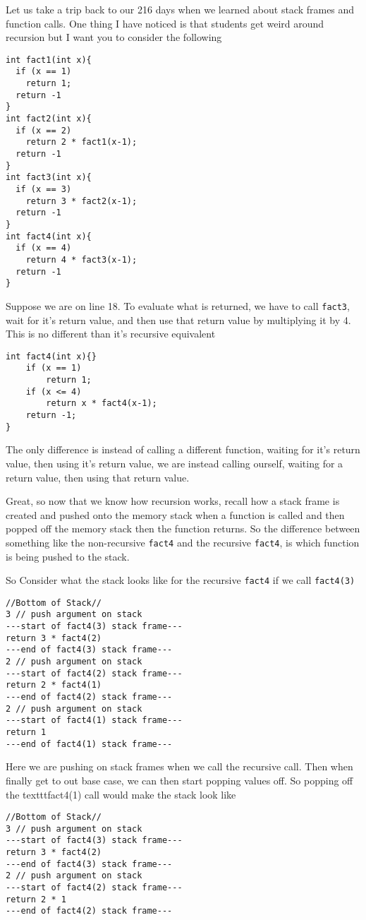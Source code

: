 \documentclass[main.tex]{subfiles}
\begin{document}
Let us take a trip back to our 216 days when we learned about stack frames and function calls. 
One thing I have noticed is that students get weird around recursion but I want you to consider the following 
\begin{lstlisting}[style=Mycstyle]
int fact1(int x){
  if (x == 1)
    return 1;
  return -1
}
int fact2(int x){
  if (x == 2)
    return 2 * fact1(x-1);
  return -1
}
int fact3(int x){
  if (x == 3)
    return 3 * fact2(x-1);
  return -1
}
int fact4(int x){
  if (x == 4)
    return 4 * fact3(x-1);
  return -1
}
\end{lstlisting}
Suppose we are on line 18. To evaluate what is returned, we have to call \texttt{fact3}, wait for it's return value, and then use that return value by multiplying it by 4. This is no different than it's recursive equivalent
\begin{lstlisting}[style=Mycstyle]
int fact4(int x){}
    if (x == 1)
        return 1;
    if (x <= 4)
        return x * fact4(x-1);
    return -1;
}
\end{lstlisting}
The only difference is instead of calling a different function, waiting for it's return value, then using it's return value, we are instead calling ourself, waiting for a return value, then using that return value. 

Great, so now that we know how recursion works, recall how a stack frame is created and pushed onto the memory stack when a function is called and then popped off the memory stack then the function returns. So the difference between something like the non-recursive \texttt{fact4} and the recursive \texttt{fact4}, is which function is being pushed to the stack. 

So Consider what the stack looks like for the recursive \texttt{fact4} if we call \texttt{fact4(3)}
\begin{lstlisting}[style=Mycstyle]
//Bottom of Stack//
3 // push argument on stack
---start of fact4(3) stack frame---
return 3 * fact4(2)
---end of fact4(3) stack frame---
2 // push argument on stack
---start of fact4(2) stack frame---
return 2 * fact4(1)
---end of fact4(2) stack frame---
2 // push argument on stack
---start of fact4(1) stack frame---
return 1
---end of fact4(1) stack frame---
\end{lstlisting}
Here we are pushing on stack frames when we call the recursive call. Then when finally get to out base case, we can then start popping values off. So popping off the texttt{fact4(1)} call would make the stack look like
\begin{lstlisting}[style=Mycstyle]
//Bottom of Stack//
3 // push argument on stack
---start of fact4(3) stack frame---
return 3 * fact4(2)
---end of fact4(3) stack frame---
2 // push argument on stack
---start of fact4(2) stack frame---
return 2 * 1
---end of fact4(2) stack frame---
\end{lstlisting}
\end{document}
